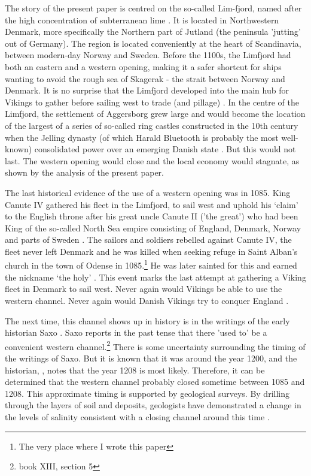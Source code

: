 \documentclass[11pt]{article}
\begin{document}
The story of the present paper is centred on the so-called Lim-fjord, named after the high concentration of subterranean lime \citep{lexlimfjord2017}. It is located in Northwestern Denmark, more specifically the Northern part of Jutland (the peninsula 'jutting' out of Germany). The region is located conveniently at the heart of Scandinavia, between modern-day Norway and Sweden. Before the 1100s, the Limfjord had both an eastern and a western opening, making it a safer shortcut for ships wanting to avoid the rough sea of Skagerak - the strait between Norway and Denmark. It is no surprise that the Limfjord developed into the main hub for Vikings to gather before sailing west to trade (and pillage) \citep{Rasmussen1966}. In the centre of the Limfjord, the settlement of Aggersborg grew large and would become the location of the largest of a series of so-called ring castles constructed in the 10th century when the Jelling dynasty (of which Harald Bluetooth is probably the most well-known) consolidated power over an emerging Danish state \citep{pedersen2014}. But this would not last. The western opening would close and the local economy would stagnate, as shown by the analysis of the present paper.

The last historical evidence of the use of a western opening was in 1085. King Canute IV gathered his fleet in the Limfjord, to sail west and uphold his ‘claim’ to the English throne after his great uncle Canute II ('the great') who had been King of the so-called North Sea empire consisting of England, Denmark, Norway and parts of Sweden \citep{Spejlborg2012}. The sailors and soldiers rebelled against Canute IV, the fleet never left Denmark and he was killed when seeking refuge in Saint Alban’s church in the town of Odense in 1085.\footnote{The very place where I wrote this paper} He was later sainted for this and earned the nickname ‘the holy’ \citep{Pajung2012}. This event marks the last attempt at gathering a Viking fleet in Denmark to sail west. Never again would Vikings be able to use the western channel. Never again would Danish Vikings try to conquer England \citep{Roesdahl2009}.

The next time, this channel shows up in history is in the writings of the early historian Saxo \cite{saxo}. Saxo reports in the past tense that there 'used to' be a convenient western channel.\footnote{\cite{saxo} book XIII, section 5} There is some uncertainty surrounding the timing of the writings of Saxo. But it is known that it was around the year 1200, and the historian, \cite{Mortensen2018}, notes that the year 1208 is most likely. Therefore, it can be determined that the western channel probably closed sometime between 1085 and 1208. This approximate timing is supported by geological surveys. By drilling through the layers of soil and deposits, geologists have demonstrated a change in the levels of salinity consistent with a closing channel around this time \citep{Christensen2004}.
\end{document}
